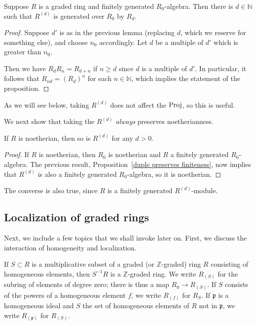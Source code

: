 \begin{proposition} 
Suppose $R$ is a graded ring and finitely generated $R_0$-algebra. Then there
is $d \in \mathbb{N}$ such that $R^{(d)}$ is generated over $R_0$ by $R_d$.
\end{proposition} 
\begin{proof} 
Suppose $d'$ is as in the previous lemma (replacing $d$, which we reserve for
something else), and choose $n_0$ accordingly. Let $d$ be a multiple of $d'$
which is greater than $n_0$.

Then we have $R_d R_n = R_{d+n}$ if $n \geq d$ since $d$ is a multiple of $d'$.
In particular, it follows that $R_{nd} = (R_d)^n$ for each $n \in \mathbb{N}$,
which implies the statement of the proposition.
\end{proof} 

As we will see below, taking $R^{(d)}$ does not affect the $\operatorname{Proj}$, so this is
useful.

We next show that taking the $R^{(d)}$ \emph{always} preserves noetherianness.

\begin{proposition} \label{filtnoetherian}
If $R$ is noetherian, then so is $R^{(d)}$ for any $d>0$.
\end{proposition} 
\begin{proof} 
If $R$ is noetherian, then $R_0$ is noetherian and $R$ a finitely generated
$R_0$-algebra. The previous result, Proposition~\ref{duple preserves
finiteness},  now implies that $R^{(d)} $ is also a
finitely generated $R_0$-algebra, so it is noetherian.
\end{proof} 

The converse is also true, since $R$ is a finitely generated $R^{(d)}$-module.

\subsection{Localization of graded rings}
Next, we include a few topics that we shall invoke later on. 
First, we discuss the interaction of homogeneity and localization.

If $S \subset R$ is a multiplicative subset of a graded (or
$\mathbb{Z}$-graded) ring $R$ consisting of homogeneous elements, then $S^{-1}
R$ is a $\mathbb{Z}$-graded ring.  We write $R_{(S)}$ for the subring of
elements of degree zero; there is thus a map $R_0 \to R_{(S)}$.
If $S$ consists of the powers of a homogeneous element $f$, we write $R_{(f)}$
for $R_S$. If $\mathfrak{p}$ is a homogeneous ideal and $S$ the set of
homogeneous elements of $R$ not in $\mathfrak{p}$, we write
$R_{(\mathfrak{p})}$ for $R_{(S)}$.

